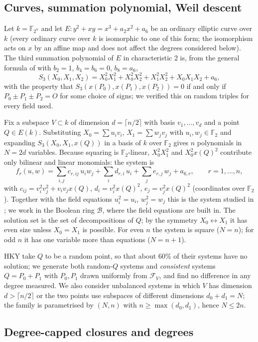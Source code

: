 \documentclass[11pt,a4paper]{article}
\theoremstyle{remark}\newtheorem{remark}{Remark}
\newcommand{\F}{\mathbb{F}}
\newcommand{\B}{\mathcal{B}}
\begin{document}
\subsection{Curves, summation polynomial, Weil descent}

Let $k=\F_{2^n}$ and let $E: y^2+xy=x^3+a_2x^2+a_6$ be an ordinary elliptic curve over $k$ (every ordinary curve over $k$ is isomorphic to one of this form; the isomorphism acts on $x$ by an affine map and does not affect the degrees considered below). The third summation polynomial of $E$ in characteristic 2 is, from the general formula of \cite[Sec.~5.1]{HKY15} with $b_2=1$, $b_4=b_6=0$, $b_8=a_6$,
\[
S_3(X_0,X_1,X_2)=X_0^2X_1^2+X_0^2X_2^2+X_1^2X_2^2+X_0X_1X_2+a_6,
\]
with the property that $S_3(x(P_0),x(P_1),x(P_2))=0$ if and only if $P_0\pm P_1\pm P_2=O$ for some choice of signs; we verified this on random triples for every field used.

Fix a subspace $V\subset k$ of dimension $d=\lceil n/2\rceil$ with basis $v_1,\dots,v_d$ and a point $Q\in E(k)$. Substituting $X_0=\sum u_iv_i$, $X_1=\sum w_jv_j$ with $u_i,w_j\in\F_2$ and expanding $S_3(X_0,X_1,x(Q))$ in a basis of $k$ over $\F_2$ gives $n$ polynomials in $N=2d$ variables. Because squaring is $\F_2$-linear, $X_0^2X_1^2$ and $X_0^2x(Q)^2$ contribute only bilinear and linear monomials: the system is
\[
f_r(u,w)=\sum_{i,j}c_{r,ij}\,u_iw_j+\sum_i d_{r,i}\,u_i+\sum_j e_{r,j}\,w_j+a_{6,r},\qquad r=1,\dots,n,
\]
with $c_{ij}=v_i^2v_j^2+v_iv_jx(Q)$, $d_i=v_i^2x(Q)^2$, $e_j=v_j^2x(Q)^2$ (coordinates over $\F_2$). Together with the field equations $u_i^2=u_i$, $w_j^2=w_j$ this is the system studied in \cite[Sec.~5.2]{HKY15}; we work in the Boolean ring $\B$, where the field equations are built in. The solution set is the set of decompositions of $Q$; by the symmetry $X_0\leftrightarrow X_1$ it has even size unless $X_0=X_1$ is possible. For even $n$ the system is square ($N=n$); for odd $n$ it has one variable more than equations ($N=n+1$).

HKY take $Q$ to be a random point, so that about 60\% of their systems have no solution; we generate both random-$Q$ systems and \emph{consistent} systems $Q=P_0+P_1$ with $P_0,P_1$ drawn uniformly from $\mathcal F_V$, and find no difference in any degree measured. We also consider unbalanced systems in which $V$ has dimension $d>\lceil n/2\rceil$ or the two points use subspaces of different dimensions $d_0+d_1=N$; the family is parametrised by $(N,n)$ with $n\ge\max(d_0,d_1)$, hence $N\le 2n$.

\subsection{Degree-capped closures and degrees}
\end{document}
